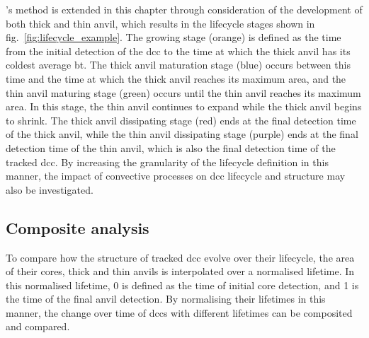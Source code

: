 \citeauthor{futyan_deep_2007}'s method is extended in this chapter through consideration of the development of both thick and thin anvil, which results in the lifecycle stages shown in fig.~\ref{fig:lifecycle_example}.
The growing stage (orange) is defined as the time from the initial detection of the \acrshort{dcc} to the time at which the thick anvil has its coldest average \acrshort{bt}.
The thick anvil maturation stage (blue) occurs between this time and the time at which the thick anvil reaches its maximum area, and the thin anvil maturing stage (green) occurs until the thin anvil reaches its maximum area.
In this stage, the thin anvil continues to expand while the thick anvil begins to shrink.
The thick anvil dissipating stage (red) ends at the final detection time of the thick anvil, while the thin anvil dissipating stage (purple) ends at the final detection time of the thin anvil, which is also the final detection time of the tracked \acrshort{dcc}.
By increasing the granularity of the lifecycle definition in this manner, the impact of convective processes on \acrshort{dcc} lifecycle and structure may also be investigated.

\subsection{Composite analysis} \label{sec:composite_definition}

To compare how the structure of tracked \acrshort{dcc} evolve over their lifecycle, the area of their cores, thick and thin anvils is interpolated over a normalised lifetime.
In this normalised lifetime, 0 is defined as the time of initial core detection, and 1 is the time of the final anvil detection.
By normalising their lifetimes in this manner, the change over time of \acrshort{dcc}s with different lifetimes can be composited and compared.


